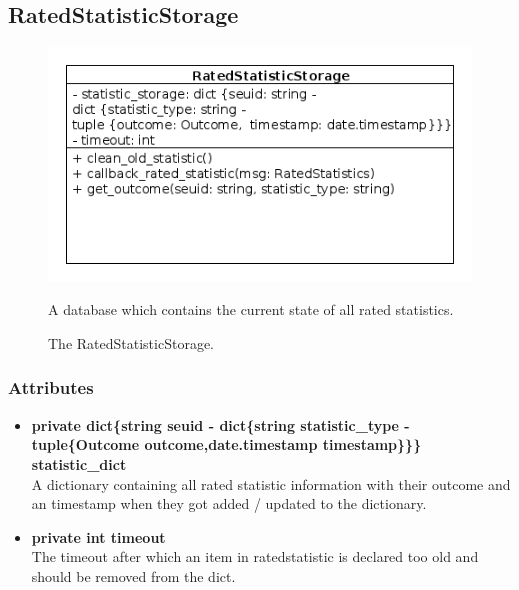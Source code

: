 \newpage
\subsection{RatedStatisticStorage}
\begin{figure}[htbp]
	\begin{minipage}[t]{10cm}
		\vspace{0pt}
		\centering
		\includegraphics[scale=0.6]{./diagram_pictures/reactor/RatedStatisticStorage.png}
		\caption{The RatedStatisticStorage.}
	\end{minipage}
	\hfill
	\begin{minipage}[t]{6cm}
		\vspace{10pt}
			A database which contains the current state of all rated statistics.
	\end{minipage}
\end{figure}  

\subsubsection{Attributes}
\begin{itemize}
	\item \textbf{ private dict\{string seuid - dict\{string statistic\_type - tuple\{Outcome outcome,date.timestamp timestamp\}\}\} statistic\_dict }\\
		A dictionary containing all rated statistic information with their outcome and an timestamp when they got added / updated to the dictionary.
	\item \textbf{ private int timeout }\\
		The timeout after which an item in ratedstatistic is declared too old and should be removed from the dict.
\end{itemize}
